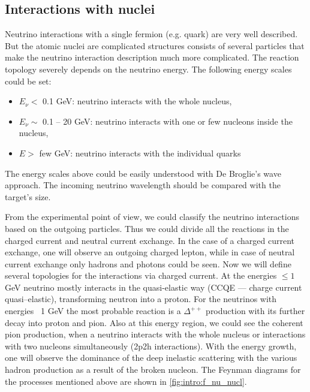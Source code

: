 \documentclass[../main.tex]{subfiles}
\begin{document}
\subsection{Interactions with nuclei}
\label{sec:intro:nuclei}
Neutrino interactions with a single fermion (e.g. quark) are very well described. But the atomic nuclei are complicated structures consists of several particles that make the neutrino interaction description much more complicated. The reaction topology severely depends on the neutrino energy. The following energy scales could be set:
\begin{itemize}
  \item $E_\nu <$ 0.1 GeV: neutrino interacts with the whole nucleus,
  \item $E_\nu\sim$ 0.1 -- 20 GeV: neutrino interacts with one or few nucleons inside the nucleus,
  \item $E>$ few GeV: neutrino interacts with the individual quarks
\end{itemize}

The energy scales above could be easily understood with De Broglie's wave approach. The incoming neutrino wavelength should be compared with the target's size.

From the experimental point of view, we could classify the neutrino interactions based on the outgoing particles. Thus we could divide all the reactions in the charged current and neutral current exchange. In the case of a charged current exchange, one will observe an outgoing charged lepton, while in case of neutral current exchange only hadrons and photons could be seen. Now we will define several topologies for the interactions via charged current. At the energies $\le1$ GeV neutrino mostly interacts in the quasi-elastic way (CCQE --- charge current quasi--elastic), transforming neutron into a proton. For the neutrinos with energies ~1 GeV the most probable reaction is a $\Delta^{++}$ production with its further decay into proton and pion. Also at this energy region, we could see the coherent pion production, when a neutrino interacts with the whole nucleus or interactions with two nucleons simultaneously (2p2h interactions). With the energy growth, one will observe the dominance of the deep inelastic scattering with the various hadron production as a result of the broken nucleon. The Feynman diagrams for the processes mentioned above are shown in \autoref{fig:intro:f_nu_nucl}.
\end{document}
